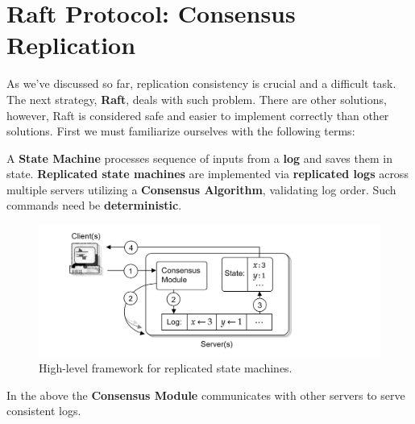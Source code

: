 \section{Raft Protocol: Consensus Replication}
As we've discussed so far, replication consistency is crucial and a 
difficult task. The next strategy, \textbf{Raft}, deals with such problem.
There are other solutions, however, Raft is considered safe and easier to 
implement correctly than other solutions. First we must familiarize ourselves with the following terms:
\begin{Def}
    
    A \textbf{State Machine} processes sequence of inputs from a \textbf{log} and saves them
    in state.
    \textbf{Replicated state machines} are implemented via \textbf{replicated logs} across multiple servers
    utilizing a \textbf{Consensus Algorithm}, validating log order. Such commands need be \textbf{deterministic}.
\end{Def}

\vspace{-1.5em}
\begin{figure}[h]
    \centering
    \includegraphics[width=1\textwidth]{Sections/raft/state.png}
    \caption{High-level framework for replicated state machines.}
\end{figure}

\noindent
In the above the \textbf{Consensus Module} communicates with other servers to serve consistent logs. 

\newpage 
